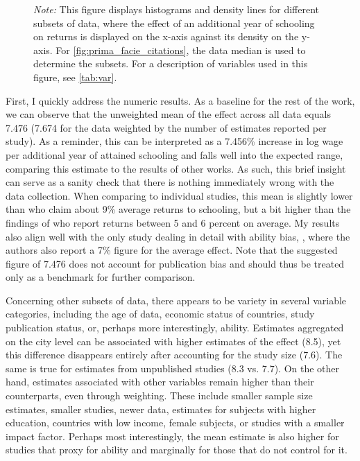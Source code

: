 \begin{figure}[!htbp]
\begin{center}
\end{center}\vspace{-0.6cm}
\captionsetup{width=0.75\textwidth, font = scriptsize}
\caption*{\emph{Note:} This figure displays histograms and density lines for different subsets of data, where the effect of an additional year of schooling on returns is displayed on the x-axis against its density on the y-axis. For \autoref{fig:prima_facie_citations}, the data median is used to determine the subsets. For a description of variables used in this figure, see \autoref{tab:var}.}
\end{figure}


First, I quickly address the numeric results. As a baseline for the rest of the work, we can observe that the unweighted mean of the effect across all data equals 7.476 (7.674 for the data weighted by the number of estimates reported per study). As a reminder, this can be interpreted as a 7.456\% increase in log wage per additional year of attained schooling and falls well into the expected range, comparing this estimate to the results of other works. As such, this brief insight can serve as a sanity check that there is nothing immediately wrong with the data collection. When comparing to individual studies, this mean is slightly lower than \cite{psacharopoulos2018meta} who claim about 9\% average returns to schooling, but a bit higher than the findings of \cite{fleisher2005meta} who report returns between 5 and 6 percent on average. My results also align well with the only study dealing in detail with ability bias, \cite{wincenciak2022meta}, where the authors also report a 7\% figure for the average effect. Note that the suggested figure of 7.476 does not account for publication bias and should thus be treated only as a benchmark for further comparison.

Concerning other subsets of data, there appears to be variety in several variable categories, including the age of data, economic status of countries, study publication status, or, perhaps more interestingly, ability. Estimates aggregated on the city level can be associated with higher estimates of the effect (8.5), yet this difference disappears entirely after accounting for the study size (7.6). The same is true for estimates from unpublished studies (8.3 vs. 7.7). On the other hand, estimates associated with other variables remain higher than their counterparts, even through weighting. These include smaller sample size estimates, smaller studies, newer data, estimates for subjects with higher education, countries with low income, female subjects, or studies with a smaller impact factor. Perhaps most interestingly, the mean estimate is also higher for studies that proxy for ability and marginally for those that do not control for it.

